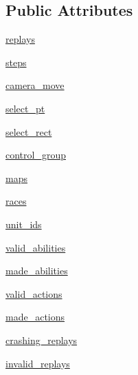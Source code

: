 \subsection*{Public Attributes}
\begin{DoxyCompactItemize}
\item 
\mbox{\hyperlink{classpysc2_1_1bin_1_1replay__actions_1_1_replay_stats_a3f2353273907db292357ff4d6974d455}{replays}}
\item 
\mbox{\hyperlink{classpysc2_1_1bin_1_1replay__actions_1_1_replay_stats_aebc6e49ad7cb6a3cca4fb0aae371ec42}{steps}}
\item 
\mbox{\hyperlink{classpysc2_1_1bin_1_1replay__actions_1_1_replay_stats_a23f8c5cfa630734292c265e0819a1261}{camera\+\_\+move}}
\item 
\mbox{\hyperlink{classpysc2_1_1bin_1_1replay__actions_1_1_replay_stats_ac0e08b0dfe1a14b2e32c1c0d123cc862}{select\+\_\+pt}}
\item 
\mbox{\hyperlink{classpysc2_1_1bin_1_1replay__actions_1_1_replay_stats_a2f6381eb34da9ea54162c49284236276}{select\+\_\+rect}}
\item 
\mbox{\hyperlink{classpysc2_1_1bin_1_1replay__actions_1_1_replay_stats_aa8a49da671c72bc25483a64602ce22f6}{control\+\_\+group}}
\item 
\mbox{\hyperlink{classpysc2_1_1bin_1_1replay__actions_1_1_replay_stats_afd0127821e5bf89a050e988069fec437}{maps}}
\item 
\mbox{\hyperlink{classpysc2_1_1bin_1_1replay__actions_1_1_replay_stats_a972fabc8b774ed459571917fa7a1b6a8}{races}}
\item 
\mbox{\hyperlink{classpysc2_1_1bin_1_1replay__actions_1_1_replay_stats_a2e0ef03b777626e6e0388f65773b62ff}{unit\+\_\+ids}}
\item 
\mbox{\hyperlink{classpysc2_1_1bin_1_1replay__actions_1_1_replay_stats_a43698086bf36b7b254aa929da0d85bef}{valid\+\_\+abilities}}
\item 
\mbox{\hyperlink{classpysc2_1_1bin_1_1replay__actions_1_1_replay_stats_a61b2c42a1c03c9d097cf27d6fac5ba88}{made\+\_\+abilities}}
\item 
\mbox{\hyperlink{classpysc2_1_1bin_1_1replay__actions_1_1_replay_stats_abc6999e91114dc655c618a6f01711426}{valid\+\_\+actions}}
\item 
\mbox{\hyperlink{classpysc2_1_1bin_1_1replay__actions_1_1_replay_stats_ad557a262e17fdee51133c04a18ab2abc}{made\+\_\+actions}}
\item 
\mbox{\hyperlink{classpysc2_1_1bin_1_1replay__actions_1_1_replay_stats_aa7697abe01d65e2c2329d3d6ea8963a0}{crashing\+\_\+replays}}
\item 
\mbox{\hyperlink{classpysc2_1_1bin_1_1replay__actions_1_1_replay_stats_ab6e0f694ff1176c17c4c2d31d2feae1e}{invalid\+\_\+replays}}
\end{DoxyCompactItemize}


